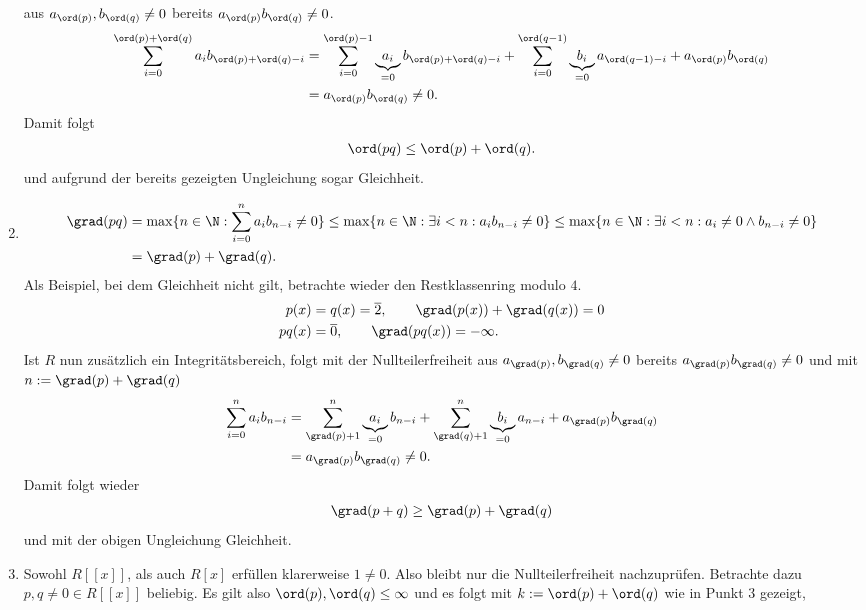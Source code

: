 \begin{solution}
\begin{enumerate}
  aus $a_{\ord(p)}, b_{\ord(q)} \neq 0$ bereits $a_{\ord(p)}b_{\ord(q)} \neq 0$.
  \begin{align*}
    \sum_{i=0}^{\ord(p) + \ord(q)}a_ib_{\ord(p) + \ord(q)-i} &=
    \sum_{i=0}^{\ord(p) -1}\underbrace{a_i}_{=0}b_{\ord(p) + \ord(q)-i} +
    \sum_{i = 0}^{\ord(q - 1)}\underbrace{b_i}_{=0}a_{\ord(q-1) - i}
    + a_{\ord(p)}b_{\ord(q)} \\
    &= a_{\ord(p)}b_{\ord(q)} \neq 0.
  \end{align*}
  Damit folgt
  \begin{align*}
    \ord(pq) \leq \ord(p) + \ord(q).
  \end{align*}
  und aufgrund der bereits gezeigten Ungleichung sogar Gleichheit.
  \item \begin{align*}
    \grad(pq) &= \max\{n \in \N: \sum_{i=0}^{n}a_ib_{n-i} \neq 0\}
    \leq \max\{n \in \N: \exists i < n: a_ib_{n-i} \neq 0\}
    \leq \max\{n \in \N: \exists i < n: a_i \neq 0 \land b_{n-i} \neq 0\} \\
    &= \grad(p) + \grad(q).
  \end{align*}
  Als Beispiel, bei dem Gleichheit nicht gilt, betrachte wieder den Restklassenring modulo $4$.
  \begin{align*}
  p(x) &= q(x) = \overline{2}, \qquad \grad(p(x)) + \grad(q(x)) = 0 \\
  pq(x) &= \overline{0}, \qquad \grad(pq(x)) = -\infty.
  \end{align*}
  Ist $R$ nun zusätzlich ein Integritätsbereich, folgt mit der Nullteilerfreiheit
  aus $a_{\grad(p)}, b_{\grad(q)} \neq 0$ bereits $a_{\grad(p)}b_{\grad(q)} \neq 0$
  und mit $n := \grad(p) + \grad(q)$
  \begin{align*}
  \sum_{i=0}^{n}a_ib_{n-i} &=
  \sum_{\grad(p) + 1}^{n}\underbrace{a_i}_{=0}b_{n - i} +
  \sum_{\grad(q) + 1}^{n}\underbrace{b_i}_{=0}a_{n - i}
  + a_{\grad(p)}b_{\grad(q)} \\
  &= a_{\grad(p)}b_{\grad(q)} \neq 0.
  \end{align*}
  Damit folgt wieder
  \begin{align*}
    \grad(p + q) \geq \grad(p) + \grad(q)
  \end{align*}
  und mit der obigen Ungleichung Gleichheit.
  \item Sowohl $R[[x]]$, als auch $R[x]$ erfüllen klarerweise $1 \neq 0$.
  Also bleibt nur die Nullteilerfreiheit nachzuprüfen. Betrachte dazu
  $p,q \neq 0 \in R[[x]]$ beliebig. Es gilt also $\ord(p), \ord(q) \leq \infty$
  und es folgt mit $k := \ord(p) + \ord(q)$ wie in Punkt 3 gezeigt,

\end{enumerate}
\end{solution}
